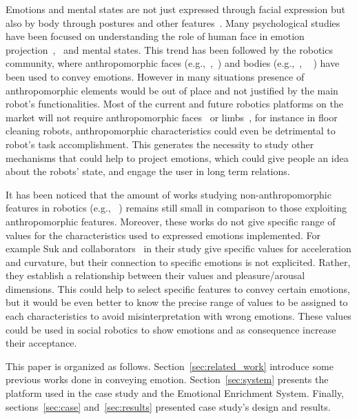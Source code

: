 Emotions and mental states are not just expressed through facial expression but also by body through postures and other features~\cite{Gelder2008}. Many psychological studies have been focused on understanding the role of human face in emotion projection~\cite{Ekman2004},~\cite{kleinsmith2012affective} and mental states. This trend has been followed by the robotics community, where anthropomorphic faces (e.g.,~\cite{Arras2012},~\cite{Breazeal2002}) and bodies (e.g.,~\cite{Canamero2010},
~\cite{Destephe2013}
) have been used to convey emotions.
However in many situations presence of anthropomorphic elements would be out of place and not justified by the main robot's functionalities. Most of the current and future robotics platforms on the market will not require anthropomorphic faces~\cite{Breazeal2002} or limbs~\cite{Li2011}, for instance in floor cleaning robots, anthropomorphic characteristics could even be detrimental to robot's task accomplishment.
This generates the necessity to study other mechanisms that could help to project emotions, which could give people an idea about the robots' state, and engage the user in long term relations.

It has been noticed that the amount of works studying non-anthropomorphic features in robotics (e.g.,~\cite{Saerbeck2010}
) remains still small in comparison to those exploiting anthropomorphic features. Moreover, these works do not give specific range of values for the characteristics used to expressed  emotions implemented. For example Suk and collaborators~\cite{NAM2014} in their study give specific values for acceleration and curvature,  but their connection to specific emotions is not explicited. Rather, they establish a relationship between their values and pleasure/arousal dimensions. This could help to select specific features to convey certain emotions, but it would be even better to know the precise range of values to be assigned to each characteristics to avoid  misinterpretation with wrong emotions. These values could be used in social robotics to show emotions and as consequence increase their acceptance.

This paper is organized as follows. Section~\ref{sec:related_work} introduce some previous works done in conveying emotion. Section~\ref{sec:system} presents the platform used in the case study and the Emotional Enrichment System. Finally, sections~\ref{sec:case} and~\ref{sec:results} presented case study's design and results.